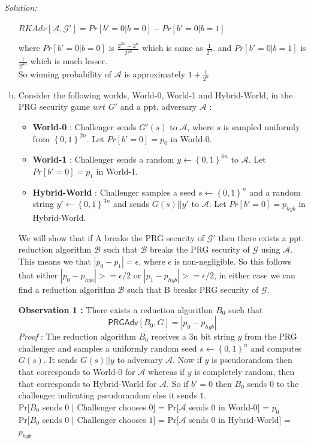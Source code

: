 \documentclass[a4paper, 11pt]{article}
\newenvironment{solution}
    {\textit{Solution:}}
    {\clearpage}
\newcommand{\bit}{\left\{0, 1\right\}}
\newcommand{\prg}{\mathsf{PRGAdv}}
\newcommand{\calA}{\mathcal{A}}
\newcommand{\calB}{\mathcal{B}}
\newcommand{\calG}{\mathcal{G}}
\begin{document}
\begin{solution}
\begin{enumerate}[(a)]
        \begin{center}
            $RKAdv[\calA, \calG'] = Pr[b'=0|b=0] - Pr[b'=0|b=1]$
        \end{center}
        where $Pr[b'=0|b=0]$ is $ \frac{2^{2n} - 2^n}{2^{2n}} $ which is same as $\frac{1}{2^n}$.
        and $Pr[b'=0|b=1]$ is $\frac{1}{2^{3n}}$ which is much lesser. \\
        So winning probability of $\calA$ is approximately $1+ \frac{1}{2^n}$

        \item Consider the following worlds, World-0, World-1 and Hybrid-World, in the PRG security game $wrt$ $G'$ and a ppt. adversary $\calA$ : 
        \begin{itemize}
            \item \textbf{World-0} : Challenger sends $G'(s)$ to $\calA$, where $s$ is sampled uniformly from $\bit^{2n}$. Let $Pr[b'=0] = p_0$ in World-0. 
            \item  \textbf{World-1} : Challenger sends a random $y 
        \gets \bit^{6n}$ to $\calA$. Let $Pr[b'=0] = p_1$ in World-1.
            \item \textbf{Hybrid-World} : Challenger samples a seed $s \gets \bit^n$ and a random string $y' \gets \bit^{3n}$ and sends $G(s)||y'$ to $\calA$. Let $Pr[b'=0] = p_{hyb}$ in Hybrid-World.
        \end{itemize}
        We will show that if A breaks the PRG security of $\calG'$ then there exists a ppt. reduction algorithm $\calB$ such that $\calB$ breaks the PRG security of $\calG$ using $\calA$. This means we that $|p_0 - p_1| = \epsilon$, where $\epsilon$ is non-negligible. So this follows that either $|p_0 - p_{hyb}| >= \epsilon/2 $ or $|p_1 - p_{hyb}| >= \epsilon/2 $, in either case we can find a reduction algorithm $\calB$ such that B breaks PRG security of $\calG$.

        \textbf{Observation 1 : } There exists a reduction algorithm $B_0$ such that
         $$\prg[B_0, G] = |p_0 - p_{hyb}|$$
        \textit{Proof} : The reduction algorithm $B_0$ receives a 3n bit string $y$ from the PRG challenger and samples a uniformly random seed $s \gets \bit^n$ and computes $G(s)$. It sends $G(s)||y$ to adversary $\calA$. Now if $y$ is pseudorandom then that corresponds to World-0 for $\calA$ whereas if $y$ is completely random, then that corresponds to Hybrid-World for $\calA$. So if $b' =0$ then $B_0$ sends $0$ to the challenger indicating pseudorandom else it sends $1$. \\
        Pr[$B_0$ sends $0$ $\mid$ Challenger chooses $0$] = Pr[$\calA$ sends 0 in World-0] = $p_0$ \\
        Pr[$B_0$ sends $0$ $\mid$ Challenger chooses $1$] = Pr[$\calA$ sends 0 in Hybrid-World] = $p_{hyb}$ \\


\end{enumerate}
\end{solution}
\end{document}
